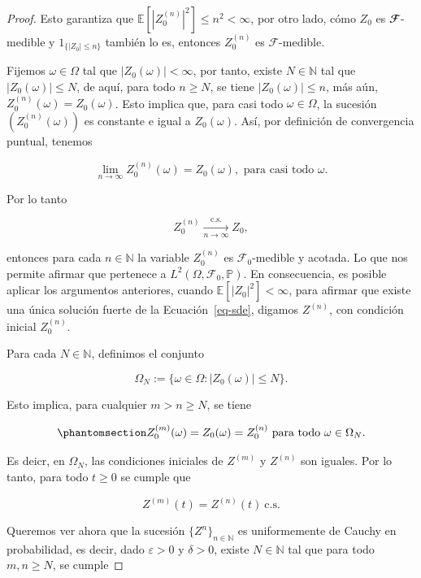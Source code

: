 \documentclass[
  spanish,
  us-letterpaper,
]{scrreprt}
\theoremstyle{plain}
\theoremstyle{plain}
\theoremstyle{definition}
\theoremstyle{plain}
\theoremstyle{remark}
\begin{document}
\begin{proof}
Esto garantiza que \(\mathbb{E}[|Z_0^{(n)}|^2]\leq n^2<\infty\), por
otro lado, cómo \(Z_0\) es \(\mathbfcal{F}\)- medible y
\(1_{\{|Z_0|\leq n\}}\) también lo es, entonces \(Z_0^{(n)}\) es
\(\mathcal{F}\)-medible.

Fijemos \(\omega\in \Omega\) tal que \(|Z_0(\omega)|<\infty\), por
tanto, existe \(N\in \mathbb{N}\) tal que \(|Z_0(\omega)|\leq N\), de
aquí, para todo \(n\geq N\), se tiene \(|Z_0(\omega)|\leq n\), más aún,
\(\displaystyle Z_0^{(n)}(\omega)=Z_0(\omega)\). Esto implica que, para
casi todo \(\omega\in\Omega\), la sucesión \((Z_0^{(n)}(\omega))\) es
constante e igual a \(Z_0(\omega)\). Así, por definición de convergencia
puntual, tenemos

\[
\lim\limits_{n\rightarrow\infty}Z_0^{(n)}(\omega)=Z_0(\omega), \text{ para casi todo $\omega$}.
\]

Por lo tanto

\[
Z_0^{(n)} \xrightarrow[n \to \infty]{\text{c.s.}} Z_0,
\]

entonces para cada \(n\in \mathbb{N}\) la variable \(Z_0^{(n)}\) es
\(\mathcal{F}_0\)-medible y acotada. Lo que nos permite afirmar que
pertenece a \(L^2(\Omega,\mathcal{F}_0,\mathbb{P})\). En consecuencia,
es posible aplicar los argumentos anteriores, cuando
\(\mathbb{E}[|Z_0|^2]<\infty\), para afirmar que existe una única
solución fuerte de la Ecuación~\ref{eq-sde}, digamos \(Z^{(n)}\), con
condición inicial \(Z_0^{(n)}\).

Para cada \(N\in \mathbb{N}\), definimos el conjunto

\[
    \Omega_N:=\{\omega\in \Omega:|Z_0(\omega)|\leq N\}.
\]

Esto implica, para cualquier \(m>n\geq N\), se tiene

\begin{equation}\phantomsection\label{eq-20}{
    Z_0^{(m)}(\omega)=Z_0(\omega)=Z_0^{(n)} \text{   para todo $\omega\in \Omega_N$}.
}\end{equation}

Es deicr, en \(\Omega_N\), las condiciones iniciales de \(Z^{(m)}\) y
\(Z^{(n)}\) son iguales. Por lo tanto, para todo \(t\geq 0\) se cumple
que

\[
    Z^{(m)}(t)=Z^{(n)}(t)\ \text{c.s.}
\]

Queremos ver ahora que la sucesión \(\{Z^{n}\}_{n\in \mathbb{N}}\) es
uniformemente de Cauchy en probabilidad, es decir, dado
\(\varepsilon>0\) y \(\delta>0\), existe \(N\in \mathbb{N}\) tal que
para todo \(m,n\geq N\), se cumple


\end{proof}
\end{document}
